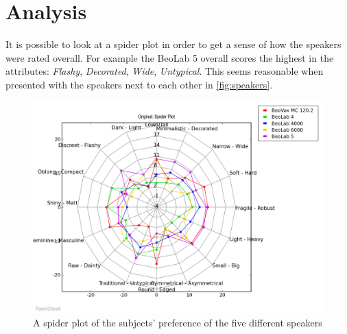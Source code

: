 \section*{Analysis}
\label{analysis}

It is possible to look at a spider plot in order to get a sense of how the speakers were rated overall. For example the BeoLab 5 overall scores the highest in the attributes: \textit{Flashy}, \textit{Decorated}, \textit{Wide}, \textit{Untypical}. This seems reasonable when presented with the speakers next to each other in \autoref{fig:speakers}. 
\begin{figure}
\centering
\includegraphics[width = \textwidth]{Figure/spider_plot.png}
\caption{A spider plot of the subjects' preference of the five different speakers}
\label{fig:spider_plot}
\end{figure}